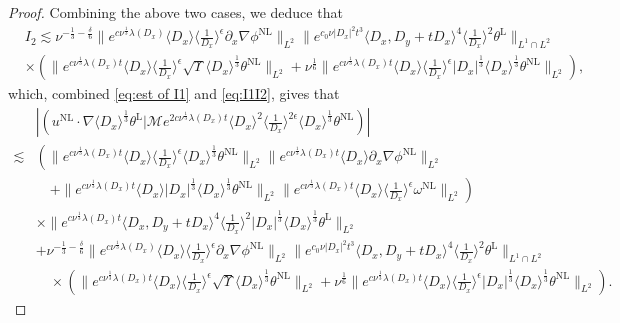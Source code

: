 \documentclass[reqno, 12pt]{amsart} %
\theoremstyle{plain} %
\theoremstyle{definition}
\theoremstyle{remark}
\numberwithin{equation}{section} %
\newcommand{\lt}{\left}
\newcommand{\rt}{\right}
\begin{document}
\begin{proof}
		
		Combining the above two cases, we deduce that
		$$
		\begin{aligned}
			& I_2 \lesssim \nu^{-\frac{1}{3}-\frac{\delta}{6}}\|e^{c \nu^{\frac{1}{3}} \lambda\left(D_x\right)}\langle D_x\rangle\langle\frac{1}{D_x}\rangle^\epsilon \partial_x \nabla \phi^{\mathrm{NL}}\|_{L^2}\|e^{c_0 \nu\left|D_x\right|^2 t^3}\langle D_x, D_y+t D_x\rangle^4\langle\frac{1}{D_x}\rangle^2 \theta^{\mathrm{L}}\|_{L^1 \cap L^2} \\
			& \times\left(\|e^{c \nu^{\frac{1}{3}} \lambda\left(D_x\right) t}\langle D_x\rangle\langle\frac{1}{D_x}\rangle^\epsilon \sqrt{\Upsilon} \langle D_x \rangle^\frac13  \theta^{\mathrm{NL}}\|_{L^2}+\nu^{\frac{1}{6}}\|e^{c \nu^{\frac{1}{3}} \lambda\left(D_x\right) t}\langle D_x\rangle\langle\frac{1}{D_x}\rangle^\epsilon |D_x|^\frac13 \langle D_x \rangle^{\frac{1}{3}} \theta^{\mathrm{NL}}\|_{L^2}\right),
		\end{aligned}
		$$
		which, combined \eqref{eq:est of I1} and \eqref{eq:I1I2}, gives that
		\begin{equation*}\begin{aligned}
				&\left|\left(u^{\mathrm{NL}} \cdot \nabla \langle D_x \rangle^\frac13 \theta^{\mathrm{L}} \big| \mathcal{M} e^{2 c \nu^{\frac{1}{3}} \lambda\left(D_x\right) t}\langle D_x\rangle^2\langle\frac{1}{D_x}\rangle^{2 \epsilon} \langle D_x \rangle^\frac13 \theta^{\mathrm{NL}}\right)\right| \\
				\lesssim &  \lt( \|e^{c \nu^{\frac{1}{3}} \lambda\left(D_x\right) t}\langle D_x\rangle  \langle\frac{1}{D_x}\rangle^\epsilon \langle D_x \rangle^\frac13  \theta^{\mathrm{NL}}\|_{L^2}\|e^{c \nu^{\frac{1}{3}} \lambda\left(D_x\right) t}\langle D_x\rangle \partial_x \nabla \phi^{\mathrm{NL}}\|_{L^2} \rt. \\
				&\lt. \quad + \|e^{c \nu^{\frac{1}{3}} \lambda\left(D_x\right) t}\langle D_x\rangle\left|D_x\right|^{\frac{1}{3}} \langle D_x \rangle^\frac13  \theta^{\mathrm{NL}}\|_{L^2}\|e^{c \nu^{\frac{1}{3}} \lambda\left(D_x\right) t}\langle D_x\rangle\langle\frac{1}{D_x}\rangle^\epsilon \omega^{\mathrm{NL}}\|_{L^2} \rt) \\
				&  \times\|e^{c \nu^{\frac{1}{3}} \lambda\left(D_x\right) t}\langle D_x, D_y+t D_x\rangle^4\langle\frac{1}{D_x}\rangle^2\left|D_x\right|^{\frac{1}{3}} \langle D_x \rangle^\frac13  \theta^{\mathrm{L}}\|_{L^2} \\
				&  + \nu^{-\frac{1}{3}-\frac{\delta}{6}}\|e^{c \nu^{\frac{1}{3}} \lambda\left(D_x\right)}\langle D_x\rangle\langle\frac{1}{D_x}\rangle^\epsilon \partial_x \nabla \phi^{\mathrm{NL}}\|_{L^2}\|e^{c_0 \nu\left|D_x\right|^2 t^3}\langle D_x, D_y+t D_x\rangle^4\langle\frac{1}{D_x}\rangle^2 \theta^{\mathrm{L}}\|_{L^1 \cap L^2} \\
				&\quad  \times\left(\|e^{c \nu^{\frac{1}{3}} \lambda\left(D_x\right) t}\langle D_x\rangle\langle\frac{1}{D_x}\rangle^\epsilon \sqrt{\Upsilon} \langle D_x \rangle^\frac13  \theta^{\mathrm{NL}}\|_{L^2}+\nu^{\frac{1}{6}}\|e^{c \nu^{\frac{1}{3}} \lambda\left(D_x\right) t}\langle D_x\rangle\langle\frac{1}{D_x}\rangle^\epsilon |D_x|^\frac13 \langle D_x \rangle^{\frac{1}{3}} \theta^{\mathrm{NL}}\|_{L^2}\right).
		\end{aligned}\end{equation*}
	

\end{proof}
\end{document}
